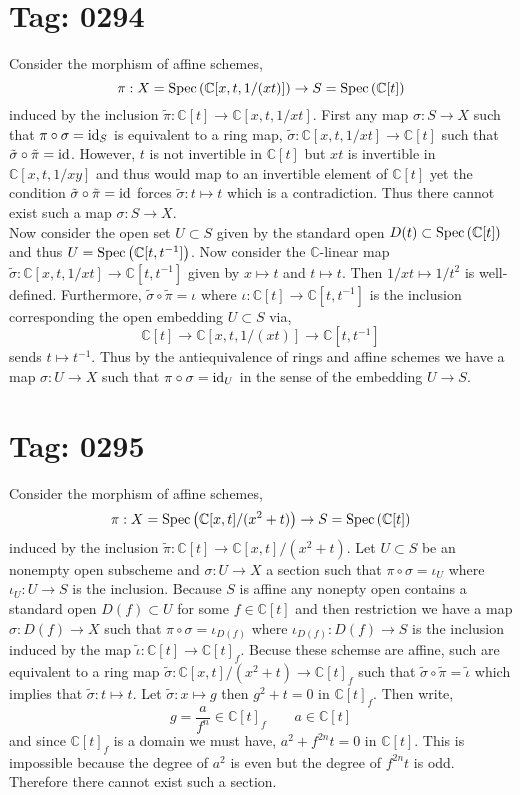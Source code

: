 \documentclass[12pt]{article}
\begin{document}

\section{Tag: 0294}

\renewcommand{\C}{\mathbb{C}}

Consider the morphism of affine schemes,
\[ \pi : X = \Spec{\C[x, t, 1/(xt)]} \to S = \Spec{\C[t]} \]
induced by the inclusion $\tilde{\pi} : \C[t] \to \C[x, t, 1/xt]$.
First any map $\sigma : S \to X$ such that $\pi \circ \sigma = \mathrm{id}_S$ is equivalent to a ring map, $\tilde{\sigma} : \C[x, t, 1/xt] \to \C[t]$ such that $\tilde{\sigma} \circ \tilde{\pi} = \mathrm{id}$. However, $t$ is not invertible in $\C[t]$ but $x t$ is invertible in $\C[x,t, 1/xy]$ and thus would map to an invertible element of $\C[t]$ yet the condition $\tilde{\sigma} \circ \tilde{\pi} = \mathrm{id}$ forces $\tilde{\sigma} : t \mapsto t$ which is a contradiction. Thus there cannot exist such a map $\sigma : S \to X$.
\bigskip\\
Now consider the open set $U \subset S$ given by the standard open $D(t) \subset \Spec{\C[t]}$ and thus $U = \Spec{\C[t,t^{-1}]}$. Now consider the $\C$-linear map $\tilde{\sigma} : \C[x, t, 1/xt] \to \C[t, t^{-1}]$ given by $x \mapsto t$ and $t \mapsto t$. Then $1/xt \mapsto 1/t^2$ is well-defined. Furthermore, $\tilde{\sigma} \circ \tilde{\pi} = \iota$ where $\iota : \C[t] \to \C[t, t^{-1}]$ is the inclusion corresponding the open embedding $U \subset S$ via,
\[ \C[t] \to \C[x,t, 1/(xt)] \to \C[t, t^{-1}] \]
sends $t \mapsto t^{-1}$. Thus by the antiequivalence of rings and affine schemes we have a map $\sigma : U \to X$ such that $\pi \circ \sigma = \mathrm{id}_U$ in the sense of the embedding $U \to S$. 

\section{Tag: 0295}

Consider the morphism of affine schemes,
\[ \pi : X = \Spec{\C[x, t]/(x^2 + t)} \to S = \Spec{\C[t]} \]
induced by the inclusion $\tilde{\pi} : \C[t] \to \C[x, t]/(x^2 + t)$. Let $U \subset S$ be an nonempty open subscheme and $\sigma : U \to X$ a section such that $\pi \circ \sigma = \iota_U$ where $\iota_U : U \to S$ is the inclusion. Because $S$ is affine any nonepty open contains a standard open $D(f) \subset U$ for some $f \in \C[t]$ and then restriction we have a map $\sigma : D(f) \to X$ such that $\pi \circ \sigma = \iota_{D(f)}$ where $\iota_{D(f)} : D(f) \to S$ is the inclusion induced by the map $\tilde{\iota} : \C[t] \to \C[t]_{f}$. Becuse these schemse are affine, such are equivalent to a ring map $\tilde{\sigma} : \C[x, t]/(x^2 + t) \to \C[t]_{f}$ such that $\tilde{\sigma} \circ \tilde{\pi} = \tilde{\iota}$ which implies that $\tilde{\sigma} : t \mapsto t$. Let $\tilde{\sigma} : x \mapsto g$ then $g^2 + t = 0$ in $\C[t]_f$. Then write,
\[ g = \frac{a}{f^n} \in \C[t]_f \quad \quad a \in \C[t] \]
and since $\C[t]_f$ is a domain we must have, $a^2 + f^{2n} t = 0$ in $\C[t]$. This is impossible because the degree of $a^2$ is even but the degree of $f^{2n} t$ is odd. Therefore there cannot exist such a section.  
\end{document}
